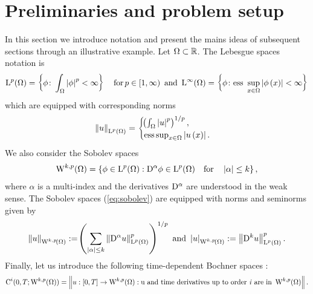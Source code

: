 \documentclass[final]{amsart}
\numberwithin{equation}{section}
\begin{document}
\section{Preliminaries and problem setup}
\label{sec:setup}
In this section we introduce notation and present the mains ideas of
subsequent sections through an illustrative example.  Let
$\Omega\subset\mathbb R$.  The Lebesgue spaces notation is
\begin{equation}
  \operatorname L^{p}(\Omega)
  =
  \left\lbrace\phi \colon \int_\Omega\left|\phi\right| ^p<\infty  \right\rbrace\quad \text{for} \,p\in\left[1,\infty\right)
    \text{ and }
    \operatorname L^{\infty}(\Omega)
    =
    \left\lbrace\phi \colon \text{ess }\sup_{x\in\Omega}\left|\phi\left(x\right)\right|<\infty  \right\rbrace
\end{equation}
which are equipped with corresponding norms
\begin{equation}
  \left\|u\right\|_{\operatorname L^{p}(\Omega)}
  =
  \begin{cases}
    \!\left({\int_\Omega\left|u\right|^p}\right)^{1/p},\\
    \text{ess}\sup_{x\in\Omega}\left|u\left(x\right)\right|.
  \end{cases}
\end{equation}
We also consider the Sobolev spaces
\begin{equation}
  \label{eq:sobolev}
  \operatorname W^{k,p}(\Omega)
  =
  \left\lbrace\phi\in \operatorname L^{p}(\Omega):\mathrm{D}^\alpha\phi\in \operatorname L^{p}(\Omega)\quad\text{for}\quad\left|\alpha\right|\leq k\right\rbrace,
\end{equation}
where $\alpha$ is a multi-index and the derivatives $\mathrm{D}^\alpha$ are
understood in the weak sense. The Sobolev spaces (\ref{eq:sobolev})
are equipped with norms and seminorms given by 
\begin{equation}
\left\|u\right\|_{\operatorname W^{k,p}\!\left({\Omega}\right)}:=\!\left({\sum_{\left|\alpha\right|\leq k}\left\|\mathrm{D}^\alpha u\right\|^p_{\operatorname L^{p}\left(\Omega\right)}}\right)^{1/p}\\
\text{ and }
\left|u\right|_{\operatorname W^{k,p}\!\left({\Omega}\right)}:=\left\|\mathrm{D}^k u\right\|^p_{\operatorname L^{p}\left(\Omega\right)}.
\end{equation}
Finally, let us introduce the following time-dependent Bochner spaces 
\cite{Evans:1998}:
\begin{equation}
  \operatorname C^{i}(0,T; \operatorname W^{k,p}(\Omega))
  =
  \left\|u:\left[0,T\right]\to \operatorname W^{k,p}\!\left({\Omega}\right): \text{u and time derivatives up to order \textit{i} are in } \operatorname W^{k,p}\!\left({\Omega}\right)\right\|.
\end{equation}
\end{document}
